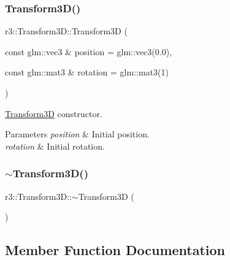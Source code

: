 \subsubsection{\texorpdfstring{Transform3\+D()}{Transform3D()}}
{\footnotesize\ttfamily r3\+::\+Transform3\+D\+::\+Transform3D (\begin{DoxyParamCaption}\item[{const glm\+::vec3 \&}]{position = {\ttfamily glm\+:\+:vec3(0.0)},  }\item[{const glm\+::mat3 \&}]{rotation = {\ttfamily glm\+:\+:mat3(1)} }\end{DoxyParamCaption})\hspace{0.3cm}{\ttfamily [explicit]}}



\mbox{\hyperlink{classr3_1_1_transform3_d}{Transform3D}} constructor. 


\begin{DoxyParams}{Parameters}
{\em position} & Initial position. \\
\hline
{\em rotation} & Initial rotation. \\
\hline
\end{DoxyParams}
\mbox{\label{classr3_1_1_transform3_d_acb2850307abbb9733d259dba96d5ec30}} 
\subsubsection{\texorpdfstring{$\sim$\+Transform3\+D()}{~Transform3D()}}
{\footnotesize\ttfamily r3\+::\+Transform3\+D\+::$\sim$\+Transform3D (\begin{DoxyParamCaption}{ }\end{DoxyParamCaption})\hspace{0.3cm}{\ttfamily [default]}}



\subsection{Member Function Documentation}
\mbox{\label{classr3_1_1_transform3_d_ac942055c92499597d01b309b4068917e}} 

